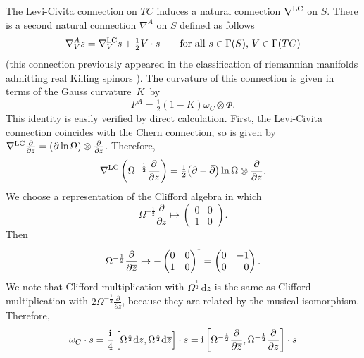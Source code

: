 \documentclass[10pt,a4paper]{amsart}
\newcommand{\1}{{\mathbb{1}}}
\def \d{\mathrm{d}}
\newcommand{\ol}{\overline}
\numberwithin{equation}{section}
\begin{document}
The Levi-Civita connection on $TC$ induces a natural connection $\nabla^{\rm LC}$ on $S$. There is a second natural connection $\nabla^A$ on $S$ defined as follows
\begin{equation}
\label{baer connection}
\nabla^A_Vs = \nabla^{\rm LC}_Vs + \tfrac{1}{2}V\cdot s\qquad \text{for all } s\in\Gamma(S),\,V\in\Gamma(TC)
\end{equation}
(this connection previously appeared in the classification of riemannian manifolds admitting real Killing spinors \cite{Bar1993}). The curvature of this connection is given in terms of the Gauss curvature~$K$~by
\begin{equation}
\label{spinor curvature}
F^A=\tfrac{1}{2}(1-K)\omega_C\otimes\Phi.
\end{equation}
This identity is easily verified by direct calculation. First, the Levi-Civita connection coincides with the Chern connection, so is given by $\nabla^{\rm LC}\frac{\partial}{\partial z} = (\partial \ln\Omega)\otimes \frac{\partial}{\partial z}$.
Therefore,
\[
\nabla^{\rm LC}\left(\Omega^{-\frac12}\frac{\partial}{\partial z}\right)=\tfrac{1}{2}\bigl(\partial-\bar\partial\bigr)\ln\Omega \otimes\frac{\partial}{\partial z}.
\]
We choose a representation of the Clifford algebra in which
\begin{equation*}
\Omega^{-\frac12}\frac{\partial}{\partial z} \mapsto \begin{pmatrix}0&0\\1&0\end{pmatrix}.
\end{equation*}
Then
\begin{equation*}
\Omega^{-\frac12}\frac{\partial}{\partial \ol{z}} \mapsto -\begin{pmatrix}0&0\\1&0\end{pmatrix}^\dagger = \begin{pmatrix}0&-1\\0&\hphantom{-}0\end{pmatrix}.
\end{equation*}
We note that Clifford multiplication with $\Omega^{\frac12}\,\d z$ is the same as Clifford multiplication with $2\Omega^{-\frac12}\frac{\partial}{\partial \ol{z}}$, because they are related by the musical isomorphism. Therefore,
\begin{equation*}
\omega_C\cdot s = \frac{{\rm i}}{4}\left[\Omega^{\frac12} \d z,\Omega^{\frac12} \d\ol{z}\right]\cdot s = {\rm i}\left[\Omega^{-\frac12}\frac{\partial}{\partial\ol{z}},\Omega^{-\frac12}\frac{\partial}{\partial z}\right]\cdot s
\end{equation*}
\end{document}
